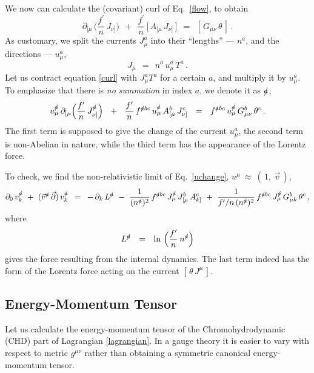 \documentclass[epsfig,12pt]{article}
\def\beq{\begin{equation}}
\def\eeq{\end{equation}}
\newcommand{\p}{\partial}
\begin{document}
	We now can calculate the (covariant) curl of Eq.~\eqref{flow}, to obtain
\beq
\label{curl}
	\partial_{[\mu}\, \Big( \frac{f^\prime}{n}\, J_{\nu]} \Big)  ~~+~~
	\frac{f^\prime}{n}\, \big[\, A_{[\mu}\, J_{\nu]} \,\big]    ~~=~~
	[\, G_{\mu\nu}\, \theta \,]\,.
\eeq
	As customary, we split the currents $ J_\mu^a $ into their ``lengths'' --- $ n^a $,
	and the directions --- $ u_\mu^a $,
\beq
	J_\mu    ~~=~~    n^a\, u_{\mu}^a\, T^a\,.
\eeq
	Let us contract equation \eqref{curl} with $ J_\mu^a T^a $ for a certain $ a $,
	and multiply it by $ u_\mu^a $.
	To emphasize that there is \emph{no summation} in index $ a $, we denote it as $ \slashed{a} $,
\beq
\label{uchange}
	u_\mu^\slashed a\, \p_{[\mu} \Big( \frac{f^\prime}{n}\, J_{\nu]}^\slashed a \Big)  ~~+~~
	\frac{f^\prime}{n}\, f^{\slashed a b c}\, u_\mu^\slashed a\, A_{[\mu}^b\, J_{\nu]}^c    ~~=~~
	f^{\slashed a b c}\, u_\mu^\slashed a\, G_{\mu\nu}^b\, \theta^c\,.
\eeq
	The first term is supposed to give the change of the current $ u_\mu^a $,
	the second term is non-Abelian in nature, while the third term has the appearance of the Lorentz force.

	To check, we find the non-relativistic limit of Eq.~\eqref{uchange}, $ u^\mu ~\approx~ (\,1,~ \vec{v}\,) $,
\beq
	\p_0\, v_k^\slashed a  ~+~  (\vec{v}{}^\slashed{a}\, \vec{\p})\, v_k^\slashed a    \,~=~\,
	-\, \p_k\, L^\slashed{a}  ~-~  \frac{1}{(n^\slashed{a})^2}\, f^{\slashed a b c}\, J_\mu^\slashed{a}\, J_{[\mu}^b\, A_{k]}^c  ~+~
	\frac{1}{f^\prime / n\, (n^{\slashed a})^2}\, f^{\slashed a b c}\, J_\mu^\slashed{a}\, G_{\mu k}^b\, \theta^c\,,
\eeq
	where
\beq
	L^\slashed{a}    ~~=~~    \ln\, \Big( \frac{f^\prime}{n}\, n^\slashed{a} \Big)
\eeq
	gives the force resulting from the internal dynamics.
	The last term indeed has the form of the Lorentz force acting on the current $ [\, \theta\, J^\mu \,] $.


\subsection{Energy-Momentum Tensor}
	Let us calculate the energy-momentum tensor of the Chromohydrodynamic (CHD) part of Lagrangian \eqref{lagrangian}.
	In a gauge theory it is easier to vary with respect to metric $ g^{\mu\nu} $ rather than obtaining
	a symmetric canonical energy-momentum tensor.
\end{document}
